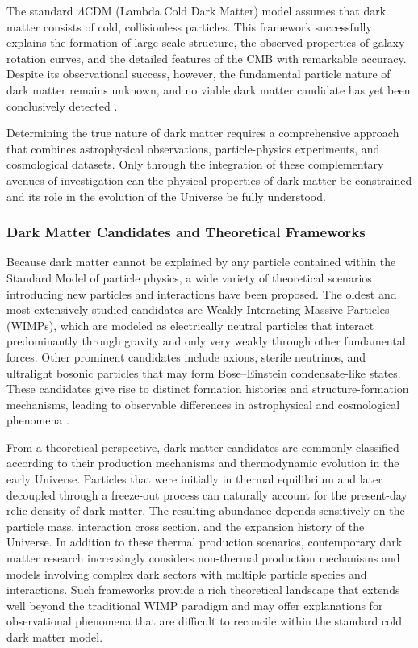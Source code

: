 The standard $\Lambda$CDM (Lambda Cold Dark Matter) model assumes that dark matter consists of cold, collisionless particles. This framework successfully explains the formation of large-scale structure, the observed properties of galaxy rotation curves, and the detailed features of the CMB with remarkable accuracy. Despite its observational success, however, the fundamental particle nature of dark matter remains unknown, and no viable dark matter candidate has yet been conclusively detected \cite{arbey2021}.

Determining the true nature of dark matter requires a comprehensive approach that combines astrophysical observations, particle-physics experiments, and cosmological datasets. Only through the integration of these complementary avenues of investigation can the physical properties of dark matter be constrained and its role in the evolution of the Universe be fully understood.

\subsubsection{Dark Matter Candidates and Theoretical Frameworks}

Because dark matter cannot be explained by any particle contained within the Standard Model of particle physics, a wide variety of theoretical scenarios introducing new particles and interactions have been proposed. The oldest and most extensively studied candidates are Weakly Interacting Massive Particles (WIMPs), which are modeled as electrically neutral particles that interact predominantly through gravity and only very weakly through other fundamental forces. Other prominent candidates include axions, sterile neutrinos, and ultralight bosonic particles that may form Bose--Einstein condensate-like states. These candidates give rise to distinct formation histories and structure-formation mechanisms, leading to observable differences in astrophysical and cosmological phenomena \cite{rubakov2014}.

From a theoretical perspective, dark matter candidates are commonly classified according to their production mechanisms and thermodynamic evolution in the early Universe. Particles that were initially in thermal equilibrium and later decoupled through a freeze-out process can naturally account for the present-day relic density of dark matter. The resulting abundance depends sensitively on the particle mass, interaction cross section, and the expansion history of the Universe. In addition to these thermal production scenarios, contemporary dark matter research increasingly considers non-thermal production mechanisms and models involving complex dark sectors with multiple particle species and interactions. Such frameworks provide a rich theoretical landscape that extends well beyond the traditional WIMP paradigm and may offer explanations for observational phenomena that are difficult to reconcile within the standard cold dark matter model.

